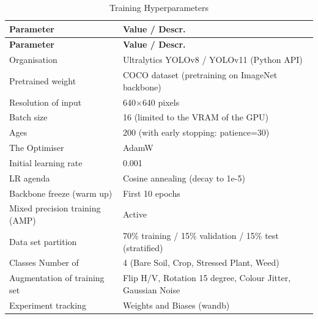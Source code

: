 \documentclass[12pt,a4paper]{report}
\renewcommand{\arraystretch}{1.25}
\begin{document}
\begingroup
\small
\setlength{\parskip}{0pt}
\setlength{\tabcolsep}{4pt}
\renewcommand{\arraystretch}{1.2}
\begin{longtable}{|P{0.35\textwidth}|P{0.55\textwidth}|}
\caption{Training Hyperparameters}\\
\hline
\textbf{Parameter} & \textbf{Value / Descr.} \\ \hline
\endfirsthead
\hline
\textbf{Parameter} & \textbf{Value / Descr.} \\ \hline
\endhead
Organisation & Ultralytics YOLOv8 / YOLOv11 (Python API) \\ \hline
Pretrained weight & COCO dataset (pretraining on ImageNet backbone) \\ \hline
Resolution of input & 640$\times$640 pixels \\ \hline
Batch size & 16 (limited to the VRAM of the GPU) \\ \hline
Ages & 200 (with early stopping: patience=30) \\ \hline
The Optimiser & AdamW \\ \hline
Initial learning rate & 0.001 \\ \hline
LR agenda & Cosine annealing (decay to 1e-5) \\ \hline
Backbone freeze (warm up) & First 10 epochs \\ \hline
Mixed precision training (AMP) & Active \\ \hline
Data set partition & 70\% training / 15\% validation / 15\% test (stratified) \\ \hline
Classes Number of & 4 (Bare Soil, Crop, Stressed Plant, Weed) \\ \hline
Augmentation of training set & Flip H/V, Rotation 15 degree, Colour Jitter, Gaussian Noise \\ \hline
Experiment tracking & Weights and Biases (wandb) \\ \hline
\end{longtable}
\endgroup
\end{document}
